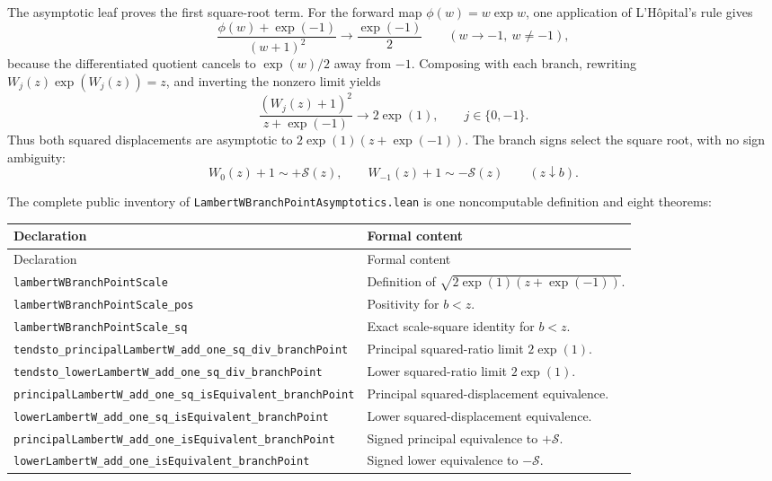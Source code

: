 \documentclass[11pt,oneside]{article}
\theoremstyle{definition}
\theoremstyle{remark}
\begin{document}
The asymptotic leaf proves the first square-root term.  For the forward map
\(\phi(w)=w\exp w\), one application of L'H\^opital's rule gives
\[
 \frac{\phi(w)+\exp(-1)}{(w+1)^2}
 \longrightarrow\frac{\exp(-1)}2
 \qquad(w\to-1,\ w\ne-1),
\]
because the differentiated quotient cancels to \(\exp(w)/2\) away from
\(-1\).  Composing with each branch, rewriting
\(W_j(z)\exp(W_j(z))=z\), and inverting the nonzero limit yields
\[
 \frac{(W_j(z)+1)^2}{z+\exp(-1)}\longrightarrow2\exp(1),
 \qquad j\in\{0,-1\}.
\]
Thus both squared displacements are asymptotic to
\(2\exp(1)(z+\exp(-1))\).  The branch signs select the square root, with no
sign ambiguity:
\[
 W_0(z)+1\sim+\mathcal S(z),
 \qquad
 W_{-1}(z)+1\sim-\mathcal S(z)
 \qquad(z\downarrow b).
\]

The complete public inventory of
\nolinkurl{LambertWBranchPointAsymptotics.lean} is one noncomputable
definition and eight theorems:
\begin{longtable}{@{}>{\raggedright\arraybackslash}p{}
                         >{\raggedright\arraybackslash}p{}@{}}
\toprule
Declaration & Formal content \\
\midrule
\endfirsthead
\toprule
Declaration & Formal content \\
\midrule
\endhead
\nolinkurl{lambertWBranchPointScale} & Definition of \(\sqrt{2\exp(1)(z+\exp(-1))}\). \\
\nolinkurl{lambertWBranchPointScale_pos} & Positivity for \(b<z\). \\
\nolinkurl{lambertWBranchPointScale_sq} & Exact scale-square identity for \(b<z\). \\
\nolinkurl{tendsto_principalLambertW_add_one_sq_div_branchPoint} & Principal squared-ratio limit \(2\exp(1)\). \\
\nolinkurl{tendsto_lowerLambertW_add_one_sq_div_branchPoint} & Lower squared-ratio limit \(2\exp(1)\). \\
\nolinkurl{principalLambertW_add_one_sq_isEquivalent_branchPoint} & Principal squared-displacement equivalence. \\
\nolinkurl{lowerLambertW_add_one_sq_isEquivalent_branchPoint} & Lower squared-displacement equivalence. \\
\nolinkurl{principalLambertW_add_one_isEquivalent_branchPoint} & Signed principal equivalence to \(+\mathcal S\). \\
\nolinkurl{lowerLambertW_add_one_isEquivalent_branchPoint} & Signed lower equivalence to \(-\mathcal S\). \\
\bottomrule
\end{longtable}
\end{document}
